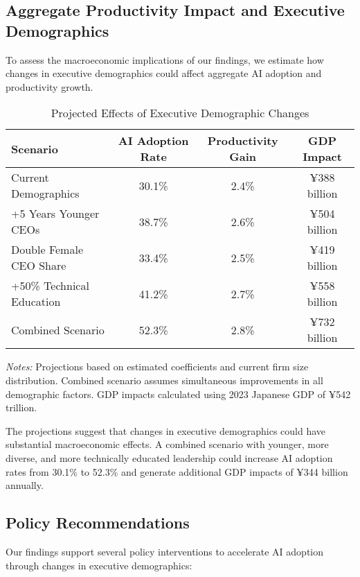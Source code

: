 \documentclass[12pt, a4paper]{article}
\begin{document}
\subsection{Aggregate Productivity Impact and Executive Demographics}

To assess the macroeconomic implications of our findings, we estimate how changes in executive demographics could affect aggregate AI adoption and productivity growth.

\begin{table}[H]
\centering
\caption{Projected Effects of Executive Demographic Changes}
\label{tab:demographic_scenarios}
\begin{tabular}{lccc}
\toprule
Scenario & AI Adoption Rate & Productivity Gain & GDP Impact \\
\midrule
Current Demographics & 30.1\% & 2.4\% & ¥388 billion \\
+5 Years Younger CEOs & 38.7\% & 2.6\% & ¥504 billion \\
Double Female CEO Share & 33.4\% & 2.5\% & ¥419 billion \\
+50\% Technical Education & 41.2\% & 2.7\% & ¥558 billion \\
Combined Scenario & 52.3\% & 2.8\% & ¥732 billion \\
\bottomrule
\end{tabular}
\begin{minipage}{\textwidth}
\footnotesize
\textit{Notes:} Projections based on estimated coefficients and current firm size distribution. Combined scenario assumes simultaneous improvements in all demographic factors. GDP impacts calculated using 2023 Japanese GDP of ¥542 trillion.
\end{minipage}
\end{table}

The projections suggest that changes in executive demographics could have substantial macroeconomic effects. A combined scenario with younger, more diverse, and more technically educated leadership could increase AI adoption rates from 30.1\% to 52.3\% and generate additional GDP impacts of ¥344 billion annually.

\subsection{Policy Recommendations}

Our findings support several policy interventions to accelerate AI adoption through changes in executive demographics:
\end{document}

